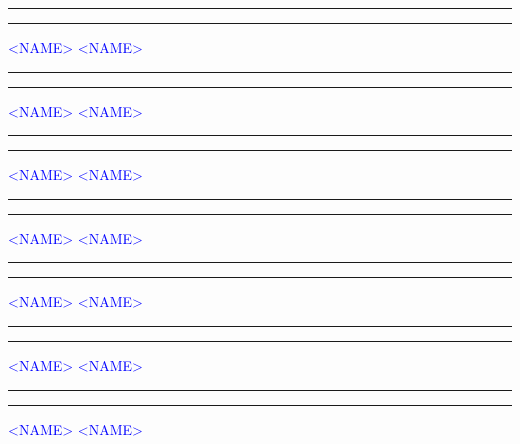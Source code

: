 \documentclass[fontsize=12pt,parskip=half]{scrartcl}
\begin{document}
\vspace{50pt}
\noindent\rule{7cm}{.4pt}\hfill\rule{7cm}{.4pt}\par
\noindent \textcolor{blue}{<NAME>} \hfill\textcolor{blue}{<NAME>}

\vspace{50pt}
\noindent\rule{7cm}{.4pt}\hfill\rule{7cm}{.4pt}\par
\noindent \textcolor{blue}{<NAME>} \hfill\textcolor{blue}{<NAME>}

\vspace{50pt}
\noindent\rule{7cm}{.4pt}\hfill\rule{7cm}{.4pt}\par
\noindent \textcolor{blue}{<NAME>} \hfill\textcolor{blue}{<NAME>}

\vspace{50pt}
\noindent\rule{7cm}{.4pt}\hfill\rule{7cm}{.4pt}\par
\noindent \textcolor{blue}{<NAME>} \hfill\textcolor{blue}{<NAME>}

\vspace{50pt}
\noindent\rule{7cm}{.4pt}\hfill\rule{7cm}{.4pt}\par
\noindent \textcolor{blue}{<NAME>} \hfill\textcolor{blue}{<NAME>}

\vspace{50pt}
\noindent\rule{7cm}{.4pt}\hfill\rule{7cm}{.4pt}\par
\noindent \textcolor{blue}{<NAME>} \hfill\textcolor{blue}{<NAME>}

\vspace{50pt}
\noindent\rule{7cm}{.4pt}\hfill\rule{7cm}{.4pt}\par
\noindent \textcolor{blue}{<NAME>} \hfill\textcolor{blue}{<NAME>}
\end{document}
